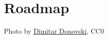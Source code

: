 \documentclass[aspectratio=169,11pt,hyperref={colorlinks=true}]{beamer}
\begin{document}

\section{Roadmap}
\begin{sectionwithpiclargecentral}{Photo by \href{https://unsplash.com/@dmtrdon}{\underline{Dimitar Donovski}}, CC0}
\end{sectionwithpiclargecentral}
\end{document}
